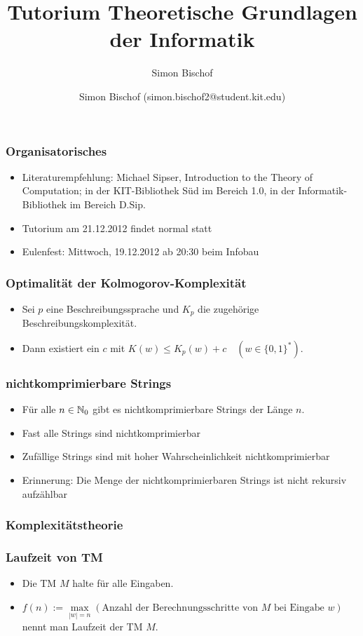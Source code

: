 \documentclass{beamer}
\author{Simon Bischof (simon.bischof2@student.kit.edu)}
\title{Tutorium Theoretische Grundlagen der Informatik}
\subtitle{Simon Bischof}
\institute{Institut f\"{u}r Kryptographie und Sicherheit}
\newcommand{\N}{\ensuremath \mathbb{N}}
\begin{document}
\begin{frame}
\maketitle
\end{frame}

\begin{frame}
\frametitle{Organisatorisches}
\begin{itemize}
\item Literaturempfehlung: Michael Sipser, Introduction to the Theory of Computation; in der KIT-Bibliothek Süd im Bereich 1.0, in der Informatik-Bibliothek im Bereich D.Sip.
\item Tutorium am 21.12.2012 findet normal statt
\item Eulenfest: Mittwoch, 19.12.2012 ab 20:30 beim Infobau
\end{itemize}
\end{frame}

\begin{frame}
\frametitle{Optimalität der Kolmogorov-Komplexität}
\begin{itemize}
\item Sei $p$ eine Beschreibungssprache und $K_p$ die zugehörige Beschreibungskomplexität.
\item Dann existiert ein $c$ mit $K(w) \leq K_p(w) + c \quad (w\in\{0,1\}^*)$.
\end{itemize}
\end{frame}

\begin{frame}
\frametitle{nichtkomprimierbare Strings}
\begin{itemize}
\item Für alle $n\in\N_0$ gibt es nichtkomprimierbare Strings der Länge $n$.\pause
\item Fast alle Strings sind nichtkomprimierbar
\item Zufällige Strings sind mit hoher Wahrscheinlichkeit nichtkomprimierbar\pause
\item Erinnerung: Die Menge der nichtkomprimierbaren Strings ist nicht rekursiv aufzählbar
\end{itemize}
\end{frame}

\begin{frame}
\frametitle{Komplexitätstheorie}
\end{frame}

\begin{frame}
\frametitle{Laufzeit von TM}
\begin{itemize}
\item Die TM $M$ halte für alle Eingaben.
\item $f(n):=\max\limits_{|w|=n} (\text{Anzahl der Berechnungsschritte von $M$ bei Eingabe $w$})$ nennt man Laufzeit der TM $M$.
\end{itemize}
\end{frame}
\end{document}
